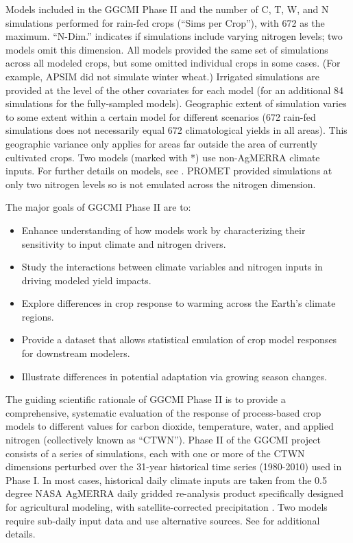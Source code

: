 \documentclass[preprint, 5p, times, twocolumn]{elsarticle}
\begin{document}
\begin{table}[!t]
 \caption{Models included in the GGCMI Phase II and the number of C, T, W, and N simulations performed for rain-fed crops (``Sims per Crop''), with 672 as the maximum. ``N-Dim.'' indicates if simulations include varying nitrogen levels; two models omit this dimension. All models provided the same set of simulations across all modeled crops, but some omitted individual crops in some cases. (For example, APSIM did not simulate winter wheat.) Irrigated simulations are provided at the level of the other covariates for each model (for an additional 84 simulations for the fully-sampled models). Geographic extent of simulation varies to some extent within a certain model for different scenarios (672 rain-fed simulations does not necessarily equal 672 climatological yields in all areas). This geographic variance only applies for areas far outside the area of currently cultivated crops. Two models (marked with *) use non-AgMERRA climate inputs. For further details on models, see \citet{Elliott2015}. \dag PROMET provided simulations at only two nitrogen levels so is not emulated across the nitrogen dimension.} 
\label{table:models}
\end{table}

The major goals of GGCMI Phase II are to:
\begin{itemize}
  \setlength\itemsep{0.3mm}
    \item Enhance understanding of how models work by characterizing their sensitivity to input climate and nitrogen drivers.
    \item Study the interactions between climate variables and nitrogen inputs in driving modeled yield impacts. 
    \item Explore differences in crop response to warming across the Earth's climate regions.
    \item Provide a dataset that allows statistical emulation of crop model responses for downstream modelers.
    \item Illustrate differences in potential adaptation via growing season changes. 
\end{itemize}

The guiding scientific rationale of GGCMI Phase II is to provide a comprehensive, systematic evaluation of the response of process-based crop models to different values for carbon dioxide, temperature, water, and applied nitrogen (collectively known as ``CTWN''). Phase II of the GGCMI project consists of a series of simulations, each with one or more of the CTWN dimensions perturbed over the 31-year historical time series (1980-2010) used in Phase I. In most cases, historical daily climate inputs are taken from the 0.5 degree NASA AgMERRA daily gridded re-analysis product specifically designed for agricultural modeling, with satellite-corrected precipitation \citep{Ruane2015}. Two models require sub-daily input data and use alternative sources. See \citet{Elliott2015} for additional details. 
\end{document}
